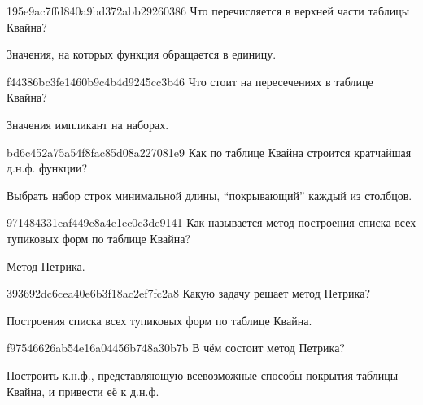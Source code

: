 \begin{note}{195e9ac7ffd840a9bd372abb29260386}
    Что перечисляется в верхней части таблицы Квайна?

    \begin{cloze}{1}
        Значения, на которых функция обращается в единицу.
    \end{cloze}
\end{note}

\begin{note}{f44386bc3fe1460b9c4b4d9245cc3b46}
    Что стоит на пересечениях в таблице Квайна?

    \begin{cloze}{1}
        Значения импликант на наборах.
    \end{cloze}
\end{note}

\begin{note}{bd6c452a75a54f8fac85d08a227081e9}
    Как по таблице Квайна строится кратчайшая д.н.ф. функции?

    \begin{cloze}{1}
        Выбрать набор строк минимальной длины, ``покрывающий'' каждый из столбцов.
    \end{cloze}
\end{note}

\begin{note}{971484331eaf449c8a4e1ec0c3de9141}
    Как называется метод построения списка всех тупиковых форм по таблице Квайна?

    \begin{cloze}{1}
        Метод Петрика.
    \end{cloze}
\end{note}

\begin{note}{393692dc6cea40e6b3f18ac2ef7fc2a8}
    Какую задачу решает метод Петрика?

    \begin{cloze}{1}
        Построения списка всех тупиковых форм по таблице Квайна.
    \end{cloze}
\end{note}

\begin{note}{f97546626ab54e16a04456b748a30b7b}
    В чём состоит метод Петрика?

    \begin{cloze}{1}
        Построить к.н.ф., представляющую всевозможные способы покрытия таблицы Квайна, и привести её к д.н.ф.
    \end{cloze}
\end{note}

